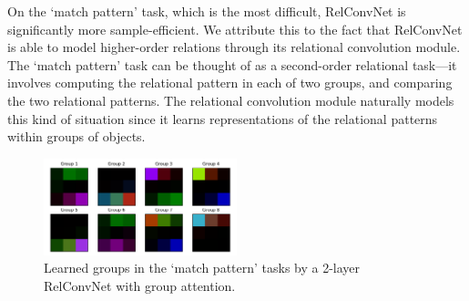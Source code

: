 On the `match pattern' task, which is the most difficult, RelConvNet is significantly more sample-efficient. We attribute this to the fact that RelConvNet is able to model higher-order relations through its relational convolution module. The `match pattern' task can be thought of as a second-order relational task---it involves computing the relational pattern in each of two groups, and comparing the two relational patterns. The relational convolution module naturally models this kind of situation since it learns representations of the relational patterns within groups of objects. %




\begin{figure}
    \centering
    \vskip-12pt
    \includegraphics[width=0.5\textwidth]{figs/group_attn_figs/match_patt_group_attn_map.pdf}
    \caption{Learned groups in the `match pattern' tasks by a 2-layer RelConvNet with group attention.}\label{fig:matchpatt_groupattn}
\end{figure}

